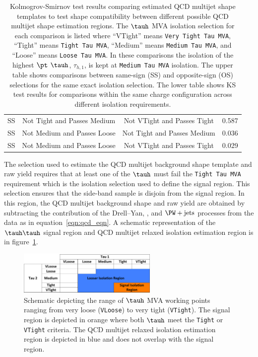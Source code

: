 \begin{table}[h!]
\begin{center}
{\begin{tabular}{|c|c|c|c|}
SS & Not Tight and Passes Medium & Not VTight and Passes Tight & 0.587 \\
SS & Not Medium and Passes Loose & Not Tight and Passes Medium & 0.036 \\
SS & Not Medium and Passes Loose & Not VTight and Passes Tight & 0.029 \\
\hline
\end{tabular}
}
\end{center}
\caption{
Kolmogrov-Smirnov test results comparing estimated QCD multijet shape templates to test shape compatibility
between different possible QCD multijet shape estimation regions. The $\tauh$ MVA isolation selection
for each comparison is listed where ``VTight'' means \texttt{Very Tight Tau MVA}, ``Tight'' means \texttt{Tight Tau MVA},
``Medium'' means \texttt{Medium Tau MVA}, and ``Loose'' means \texttt{Loose Tau MVA}.
In these comparisons the isolation of the highest $\pt$ $\tauh$, $\tau_{h,1}$,
is kept at \texttt{Medium Tau MVA} isolation.  
The upper table shows comparisons between same-sign (SS) and opposite-sign (OS) selections for the same
exact isolation selection. The lower table shows KS test results for comparisons
within the same charge configuration across different isolation requirements.
}
\label{tab:htt_qcd_ks}
\end{table} 

The selection used to estimate the QCD multijet background shape template and raw yield requires 
that at least one of the $\tauh$
must fail the \texttt{Tight Tau MVA} requirement which is the isolation selection used to 
define the signal region. This selection
ensures that the side-band sample is disjoin from the signal region.
In this region, the QCD multijet background shape and raw yield are obtained
by subtracting the contribution of the Drell--Yan, \ttbar, and $\PW+\text{jets}$ processes
from the data as in equation~\ref{eqn:qcd_eqn}.
A schematic representation of the $\tauh\tauh$ signal region and QCD multijet relaxed
isolation estimation region is in figure~\ref{fig:htt_tautau_qcd_schematic1}.


\begin{figure}[htbp]
\centering
     \includegraphics[width=0.6\textwidth]{higgs_to_taus/plots/tautau_QCD_signal_region.pdf}
     \caption{
Schematic depicting the range of $\tauh$ MVA working points ranging from very loose (\texttt{VLoose})
to very tight (\texttt{VTight}). The signal region is depicted in orange where both $\tauh$ meet the \texttt{Tight}
or \texttt{VTight} criteria. The QCD multijet relaxed isolation estimation region is depicted in blue and
does not overlap with the signal region.
     }
     \label{fig:htt_tautau_qcd_schematic1}
\end{figure}

